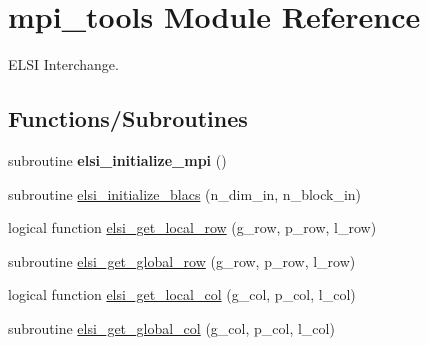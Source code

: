 \hypertarget{namespacempi__tools}{}\section{mpi\+\_\+tools Module Reference}
\label{namespacempi__tools}


E\+L\+S\+I Interchange.  


\subsection*{Functions/\+Subroutines}
\begin{DoxyCompactItemize}
\item 
\hypertarget{namespacempi__tools_a9cba2559689c5ce64d6c5b86ac3e8cdb}{}subroutine {\bfseries elsi\+\_\+initialize\+\_\+mpi} ()\label{namespacempi__tools_a9cba2559689c5ce64d6c5b86ac3e8cdb}

\item 
subroutine \hyperlink{namespacempi__tools_a9c50a7c9cd9485148d781e5ce225fb32}{elsi\+\_\+initialize\+\_\+blacs} (n\+\_\+dim\+\_\+in, n\+\_\+block\+\_\+in)
\item 
logical function \hyperlink{namespacempi__tools_aa63d86947d046e954253f04d0f06e22b}{elsi\+\_\+get\+\_\+local\+\_\+row} (g\+\_\+row, p\+\_\+row, l\+\_\+row)
\item 
subroutine \hyperlink{namespacempi__tools_a4412ba0b249ed867428c27d679e452a2}{elsi\+\_\+get\+\_\+global\+\_\+row} (g\+\_\+row, p\+\_\+row, l\+\_\+row)
\item 
logical function \hyperlink{namespacempi__tools_a31aafd851a539791c442538b69b951d1}{elsi\+\_\+get\+\_\+local\+\_\+col} (g\+\_\+col, p\+\_\+col, l\+\_\+col)
\item 
subroutine \hyperlink{namespacempi__tools_ab529b4f54215415a3221deb60f057c6a}{elsi\+\_\+get\+\_\+global\+\_\+col} (g\+\_\+col, p\+\_\+col, l\+\_\+col)
\end{DoxyCompactItemize}
